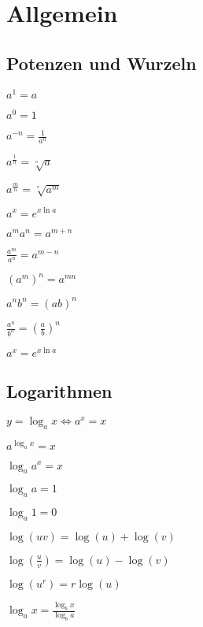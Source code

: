 
\section{Allgemein}

\subsection{Potenzen und Wurzeln}
\begin{compactitem}
    \item 
        \begin{inparaitem}
            \item $a^1 = a$
            \item $a^0 = 1$
        \end{inparaitem}
    \item $a^{-n} = \frac{1}{a^n}$
    \item 
        \begin{inparaitem}
            \item $a^{\frac{1}{n}} = \sqrt[^n]{a}$
            \item $a^{\frac{m}{n}} = \sqrt[^n]{a^m}$
        \end{inparaitem}
    \item $a^x = e^{x \ln a}$
    \item $a^ma^n = a^{m + n}$
    \item $\frac{a^m}{a^n} = a^{m - n}$
    \item $(a^m)^n = a^{m n}$
    \item $a^nb^n = (ab)^n$
    \item $\frac{a^n}{b^n} = \left( \frac{a}{b} \right)^n$
    \item $a^x = e^{x \ln a}$
\end{compactitem}

\subsection{Logarithmen}
$y = \log_a x \iff a^x = x$
\begin{compactitem}
    \item $a^{\log_a x} = x$
    \item $\log_a a^x = x$
    \item 
        \begin{inparaitem}
            \item $\log_a a = 1$
            \item $\log_a 1 = 0$
        \end{inparaitem}
    \item $\log(uv) = \log(u) + \log(v)$
    \item $\log(\frac{u}{v}) = \log(u) - \log(v)$
    \item $\log(u^r) = r \log(u)$
    \item $\log_a x = \frac{\log_b x}{\log_b a}$
\end{compactitem}

